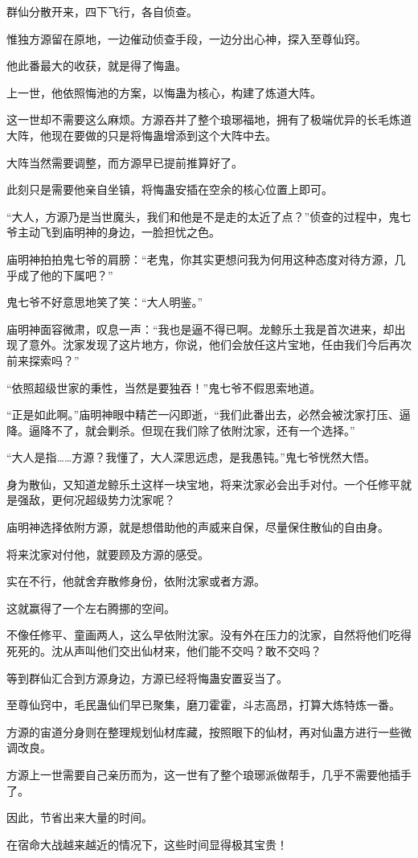 \begin{this_body}
群仙分散开来，四下飞行，各自侦查。

惟独方源留在原地，一边催动侦查手段，一边分出心神，探入至尊仙窍。

他此番最大的收获，就是得了悔蛊。

上一世，他依照悔池的方案，以悔蛊为核心，构建了炼道大阵。

这一世却不需要这么麻烦。方源吞并了整个琅琊福地，拥有了极端优异的长毛炼道大阵，他现在要做的只是将悔蛊增添到这个大阵中去。

大阵当然需要调整，而方源早已提前推算好了。

此刻只是需要他亲自坐镇，将悔蛊安插在空余的核心位置上即可。

“大人，方源乃是当世魔头，我们和他是不是走的太近了点？”侦查的过程中，鬼七爷主动飞到庙明神的身边，一脸担忧之色。

庙明神拍拍鬼七爷的肩膀：“老鬼，你其实更想问我为何用这种态度对待方源，几乎成了他的下属吧？”

鬼七爷不好意思地笑了笑：“大人明鉴。”

庙明神面容微肃，叹息一声：“我也是逼不得已啊。龙鲸乐土我是首次进来，却出现了意外。沈家发现了这片地方，你说，他们会放任这片宝地，任由我们今后再次前来探索吗？”

“依照超级世家的秉性，当然是要独吞！”鬼七爷不假思索地道。

“正是如此啊。”庙明神眼中精芒一闪即逝，“我们此番出去，必然会被沈家打压、逼降。逼降不了，就会剿杀。但现在我们除了依附沈家，还有一个选择。”

“大人是指……方源？我懂了，大人深思远虑，是我愚钝。”鬼七爷恍然大悟。

身为散仙，又知道龙鲸乐土这样一块宝地，将来沈家必会出手对付。一个任修平就是强敌，更何况超级势力沈家呢？

庙明神选择依附方源，就是想借助他的声威来自保，尽量保住散仙的自由身。

将来沈家对付他，就要顾及方源的感受。

实在不行，他就舍弃散修身份，依附沈家或者方源。

这就赢得了一个左右腾挪的空间。

不像任修平、童画两人，这么早依附沈家。没有外在压力的沈家，自然将他们吃得死死的。沈从声叫他们交出仙材来，他们能不交吗？敢不交吗？

等到群仙汇合到方源身边，方源已经将悔蛊安置妥当了。

至尊仙窍中，毛民蛊仙们早已聚集，磨刀霍霍，斗志高昂，打算大炼特炼一番。

方源的宙道分身则在整理规划仙材库藏，按照眼下的仙材，再对仙蛊方进行一些微调改良。

方源上一世需要自己亲历而为，这一世有了整个琅琊派做帮手，几乎不需要他插手了。

因此，节省出来大量的时间。

在宿命大战越来越近的情况下，这些时间显得极其宝贵！

\end{this_body}

